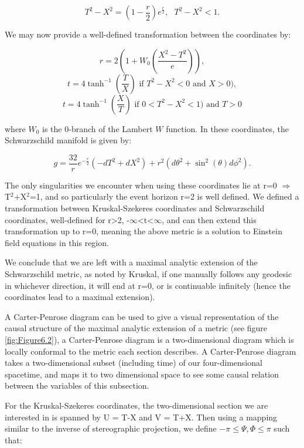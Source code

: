 \documentclass[oneside,openright,frontopenright, singlespacing]{dmathesis}
\begin{document}
	\[T^2-X^2 = \left(1-\frac{r}{2}\right)e^{\frac{r}{2}},\mbox{ } T^2-X^2<1.\]

\vspace{1em}
	We may now provide a well-defined transformation between the coordinates by:

	\[r = 2\left(1+W_0\left(\frac{X^2-T^2}{e}\right)\right),\]
	\[t = 4\tanh^{-1}\left(\frac{T}{X}\right) \mbox{ if }T^2-X^2<0 \mbox{ and } X>0),\]
	\[t = 4\tanh^{-1}\left(\frac{X}{T}\right) \mbox{ if }0<T^2-X^2<1) \mbox{ and } T>0\]

	where $W_0$ is the 0-branch of the Lambert $W$ function. In these coordinates, the Schwarzschild manifold is given by:

	\[g = \frac{32}{r}e^{-\frac{r}{2}}(-dT^2+dX^2)+r^2(d\theta^2+\sin^2(\theta)d\phi^2).\]

\vspace{1em}
	The only singularities we encounter when using these coordinates lie at r=0 $\Rightarrow$ T$^2$+X$^2$=1, and so particularly the event horizon r=2 is well defined. We defined a transformation between Kruskal-Szekeres coordinates and Schwarzschild coordinates, well-defined for r>2, -$\infty$<t<$\infty$, and can then extend this transformation up to r=0, meaning the above metric is a solution to Einstein field equations in this region. 

\vspace{1em}
	We conclude that we are left with a maximal analytic extension of the Schwarzschild metric, as noted by Kruskal, if one manually follows any geodesic in whichever direction, it will end at r=0, or is continuable infinitely (hence the coordinates lead to a maximal extension).

\vspace{1em}
	A Carter-Penrose diagram can be used to give a visual representation of the causal structure of the maximal analytic extension of a metric (see figure \ref{fig:Figure6.2}), a Carter-Penrose diagram is a two-dimensional diagram which is locally conformal to the metric each section describes. A Carter-Penrose diagram takes a two-dimensional subset (including time) of our four-dimensional spacetime, and maps it to two dimensional space to see some causal relation between the variables of this subsection.

\vspace{1em}
	For the Kruskal-Szekeres coordinates, the two-dimensional section we are interested in is spanned by U = T-X and V = T+X. Then using a mapping similar to the inverse of stereographic projection, we define $-\pi\leq\Psi,\Phi\leq\pi$ such that:
\end{document}
